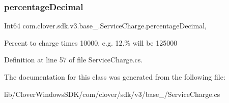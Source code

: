 \subsubsection{\texorpdfstring{percentage\+Decimal}{percentageDecimal}}
{\footnotesize\ttfamily Int64 com.\+clover.\+sdk.\+v3.\+base\+\_\+.\+Service\+Charge.\+percentage\+Decimal\hspace{0.3cm}{\ttfamily [get]}, {\ttfamily [set]}}



Percent to charge times 10000, e.\+g. 12.\% will be 125000 



Definition at line 57 of file Service\+Charge.\+cs.



The documentation for this class was generated from the following file\+:\begin{DoxyCompactItemize}
\item 
lib/\+Clover\+Windows\+S\+D\+K/com/clover/sdk/v3/base\+\_\+/Service\+Charge.\+cs\end{DoxyCompactItemize}
